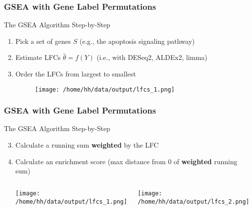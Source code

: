 \documentclass[11pt]{beamer}
\begin{document}
\begin{frame}
  \frametitle{GSEA with Gene Label Permutations}

  The GSEA Algorithm Step-by-Step
  \begin{enumerate}
    \item Pick a set of genes \(S\) (e.g., the apoptosis signaling pathway)
    \item Estimate LFCs \(\hat{\theta}=f(Y)\) (i.e., with DESeq2, ALDEx2, limma)
    \item Order the LFCs from largest to smallest
    \begin{figure}
      \texttt{[image: /home/hh/data/output/lfcs\_1.png]}
      \centering
    \end{figure}
  \end{enumerate}
\end{frame}

\begin{frame}
   \frametitle{GSEA with Gene Label Permutations}

  The GSEA Algorithm Step-by-Step
  \begin{enumerate}
    \setcounter{enumi}{2}
    \item Calculate a running sum \textbf{weighted} by the LFC
    \item Calculate an enrichment score (max distance from \(0\) of \textbf{weighted} running sum)
    \begin{columns}
        \begin{column}{0.5\textwidth}
        \begin{center}
            \texttt{[image: /home/hh/data/output/lfcs\_1.png]}
        \end{center}
        \end{column}
        \begin{column}{0.5\textwidth}  %
        \begin{center}
        \texttt{[image: /home/hh/data/output/lfcs\_2.png]}
        \end{center}
        \end{column}
    \end{columns}
  \end{enumerate} 
\end{frame}

%
\end{document}
